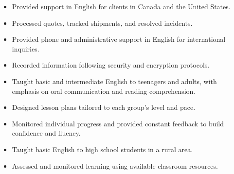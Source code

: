 \documentclass[11pt, a4paper]{awesome-cv}
\begin{document}
\begin{itemize}
  \item Provided support in English for clients in Canada and the United States.
  \item Processed quotes, tracked shipments, and resolved incidents.
\end{itemize}

\begin{itemize}
  \item Provided phone and administrative support in English for international inquiries.
  \item Recorded information following security and encryption protocols.
\end{itemize}


\begin{itemize}
  \item Taught basic and intermediate English to teenagers and adults, with emphasis on oral communication and reading comprehension.
  \item Designed lesson plans tailored to each group's level and pace.
  \item Monitored individual progress and provided constant feedback to build confidence and fluency.
\end{itemize}

\begin{itemize}
  \item Taught basic English to high school students in a rural area.
  \item Assessed and monitored learning using available classroom resources.
\end{itemize}

\end{document}

